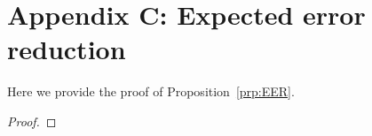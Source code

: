 \section{Appendix C: Expected error reduction}\label{app:EER}
Here we provide the proof of Proposition~\ref{prp:EER}.
\EER*
\begin{proof}


\end{proof}
